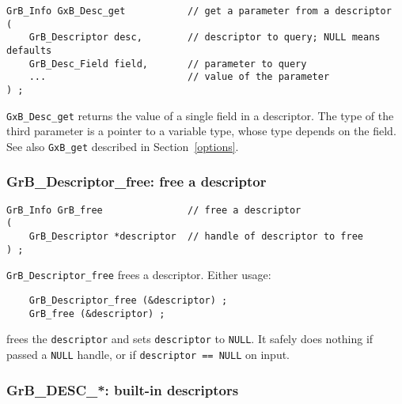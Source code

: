 \documentclass[12pt]{article}
\begin{document}
{\begin{mdframed}[userdefinedwidth=6in]
{\footnotesize
\begin{verbatim}
GrB_Info GxB_Desc_get           // get a parameter from a descriptor
(
    GrB_Descriptor desc,        // descriptor to query; NULL means defaults
    GrB_Desc_Field field,       // parameter to query
    ...                         // value of the parameter
) ;
\end{verbatim} } \end{mdframed}

\verb'GxB_Desc_get' returns the value of a single field in a descriptor.  The
type of the third parameter is a pointer to a variable type, whose type depends
on the field.  See also \verb'GxB_get' described in Section~\ref{options}.

\subsubsection{{\sf GrB\_Descriptor\_free:} free a descriptor}
\label{descriptor_free}

\begin{mdframed}[userdefinedwidth=6in]
{\footnotesize
\begin{verbatim}
GrB_Info GrB_free               // free a descriptor
(
    GrB_Descriptor *descriptor  // handle of descriptor to free
) ;
\end{verbatim} } \end{mdframed}

\verb'GrB_Descriptor_free' frees a descriptor.
Either usage:

    {\small
    \begin{verbatim}
    GrB_Descriptor_free (&descriptor) ;
    GrB_free (&descriptor) ; \end{verbatim}}

\noindent
frees the \verb'descriptor' and sets \verb'descriptor' to \verb'NULL'.  It
safely does nothing if passed a \verb'NULL' handle, or if
\verb'descriptor == NULL' on input.

\newpage
\subsubsection{{\sf GrB\_DESC\_*:}  built-in descriptors}
\label{descriptor_predefined}

}
\end{document}
